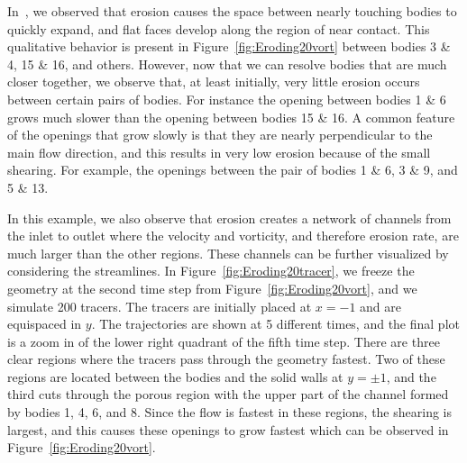 \documentclass[preprint, 10pt]{elsarticle}
\begin{document}
In~\cite{qua-moo2018}, we observed that erosion causes the space between
nearly touching bodies to quickly expand, and flat faces develop along
the region of near contact.  This qualitative behavior is present in
Figure~\ref{fig:Eroding20vort} between bodies 3 \& 4, 15 \& 16, and
others.  However, now that we can resolve bodies that are much closer
together, we observe that, at least initially, very little erosion
occurs between certain pairs of bodies.  For instance the opening
between bodies 1 \& 6 grows much slower than the opening between bodies
15 \& 16.  A common feature of the openings that grow slowly is that
they are nearly perpendicular to the main flow direction, and this
results in very low erosion because of the small shearing.  For example,
the openings between the pair of bodies 1 \& 6, 3 \& 9, and 5 \& 13. 

In this example, we also observe that erosion creates a network of
channels from the inlet to outlet where the velocity and vorticity, and
therefore erosion rate, are much larger than the other regions.  These
channels can be further visualized by considering the streamlines.  In
Figure~\ref{fig:Eroding20tracer}, we freeze the geometry at the second
time step from Figure~\ref{fig:Eroding20vort}, and we simulate 200
tracers.  The tracers are initially placed at $x=-1$ and are equispaced
in $y$.  The trajectories are shown at 5 different times, and the final
plot is a zoom in of the lower right quadrant of the fifth time step.
There are three clear regions where the tracers pass through the
geometry fastest.  Two of these regions are located between the bodies
and the solid walls at $y=\pm 1$, and the third cuts through the porous
region with the upper part of the channel formed by bodies 1, 4, 6, and
8.  Since the flow is fastest in these regions, the shearing is largest,
and this causes these openings to grow fastest which can be observed in
Figure~\ref{fig:Eroding20vort}.
\end{document}
